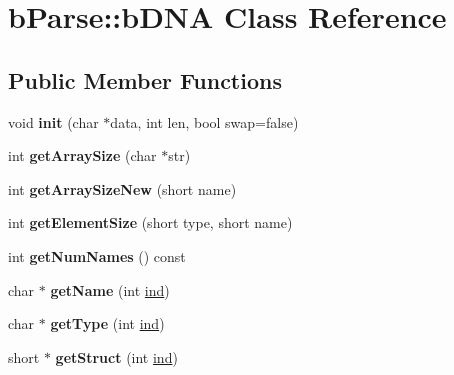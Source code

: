 \hypertarget{classb_parse_1_1b_d_n_a}{\section{b\+Parse\+:\+:b\+D\+N\+A Class Reference}
\label{classb_parse_1_1b_d_n_a}
}
\subsection*{Public Member Functions}
\begin{DoxyCompactItemize}
\item 
\hypertarget{classb_parse_1_1b_d_n_a_a3edf660f51c0228e60c08f9a38c09e76}{void {\bfseries init} (char $\ast$data, int len, bool swap=false)}\label{classb_parse_1_1b_d_n_a_a3edf660f51c0228e60c08f9a38c09e76}

\item 
\hypertarget{classb_parse_1_1b_d_n_a_ade4c12fb3952a870b2f5b04ec0535142}{int {\bfseries get\+Array\+Size} (char $\ast$str)}\label{classb_parse_1_1b_d_n_a_ade4c12fb3952a870b2f5b04ec0535142}

\item 
\hypertarget{classb_parse_1_1b_d_n_a_a0b25f1543db74feb9909c049a533a4a0}{int {\bfseries get\+Array\+Size\+New} (short name)}\label{classb_parse_1_1b_d_n_a_a0b25f1543db74feb9909c049a533a4a0}

\item 
\hypertarget{classb_parse_1_1b_d_n_a_aedcfb064bced94f9710c31176641288a}{int {\bfseries get\+Element\+Size} (short type, short name)}\label{classb_parse_1_1b_d_n_a_aedcfb064bced94f9710c31176641288a}

\item 
\hypertarget{classb_parse_1_1b_d_n_a_aea30b719c9760abf0b32067b022a09f3}{int {\bfseries get\+Num\+Names} () const }\label{classb_parse_1_1b_d_n_a_aea30b719c9760abf0b32067b022a09f3}

\item 
\hypertarget{classb_parse_1_1b_d_n_a_a708ae6bf4149039c577e4093a7953e1b}{char $\ast$ {\bfseries get\+Name} (int \hyperlink{structind}{ind})}\label{classb_parse_1_1b_d_n_a_a708ae6bf4149039c577e4093a7953e1b}

\item 
\hypertarget{classb_parse_1_1b_d_n_a_af5034a18c4c9bf25e065d75eb728a3bf}{char $\ast$ {\bfseries get\+Type} (int \hyperlink{structind}{ind})}\label{classb_parse_1_1b_d_n_a_af5034a18c4c9bf25e065d75eb728a3bf}

\item 
\hypertarget{classb_parse_1_1b_d_n_a_abe8c76c7933907d9ee532014c3080244}{short $\ast$ {\bfseries get\+Struct} (int \hyperlink{structind}{ind})}\label{classb_parse_1_1b_d_n_a_abe8c76c7933907d9ee532014c3080244}


\end{DoxyCompactItemize}
